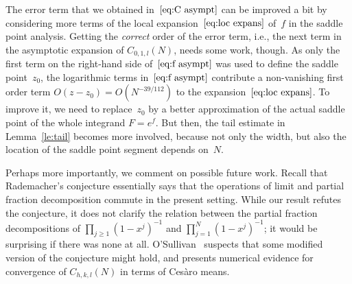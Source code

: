\documentclass[a4paper]{amsart}
\begin{document}
The error term that we obtained in~$\ref{eq:C asympt}$ can be improved a bit
by considering more terms of the local expansion~$\ref{eq:loc expans}$
of~$f$ in the saddle
point analysis. Getting the \emph{correct} order of the error term, i.e.,
the next term in the asymptotic expansion of $C_{0,1,l}(N)$, needs some work, though.
As only the first term on the right-hand side of~$\ref{eq:f asympt}$
was used to define the saddle point~$z_0$,
the logarithmic terms in~$\ref{eq:f asympt}$ contribute a non-vanishing
first order term $O(z-z_0)=O(N^{-39/112})$ to the expansion~$\ref{eq:loc expans}$.
To improve it, we need to
replace~$z_0$ by a better approximation of the actual saddle point
of the whole integrand $F=e^f$. But then, the tail estimate in
Lemma~\ref{le:tail} becomes more involved,
because not only the width, but also the location of the saddle point
segment depends on~$N$.

Perhaps more importantly, we comment on possible future work.
Recall that Rademacher's conjecture essentially says that the operations
of limit and partial fraction decomposition commute in the present setting.
While our result refutes the conjecture, it does not clarify the relation
between the partial fraction decompositions of $\prod_{j\geq 1}(1-x^j)^{-1}$
and $\prod_{j=1}^N(1-x^j)^{-1}$; it would be surprising if there was none at all. O'Sullivan~\cite{oS12} suspects
that some modified version of the conjecture might hold, and presents
numerical evidence for convergence of $C_{h,k,l}(N)$ in terms
of Ces{\`ar}o means.







\end{document}
